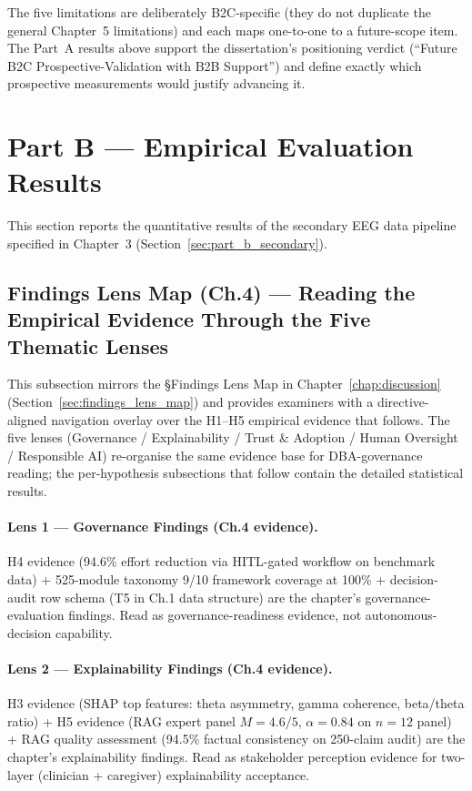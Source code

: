 \noindent The five limitations are deliberately B2C-specific (they do not duplicate the general Chapter~5 limitations) and each maps one-to-one to a future-scope item. The Part~A results above support the dissertation's positioning verdict (``Future B2C Prospective-Validation with B2B Support'') and define exactly which prospective measurements would justify advancing it.


\section{Part B --- Empirical Evaluation Results}
\label{sec:ch4_part_b}

This section reports the quantitative results of the secondary EEG data pipeline specified in Chapter~3 (Section~\ref{sec:part_b_secondary}).

\subsection{Findings Lens Map (Ch.4) --- Reading the Empirical Evidence Through the Five Thematic Lenses}
\label{sec:ch4_findings_lens_map}

This subsection mirrors the §Findings Lens Map in Chapter~\ref{chap:discussion} (Section~\ref{sec:findings_lens_map}) and provides examiners with a directive-aligned navigation overlay over the H1--H5 empirical evidence that follows. The five lenses (Governance / Explainability / Trust \& Adoption / Human Oversight / Responsible AI) re-organise the same evidence base for DBA-governance reading; the per-hypothesis subsections that follow contain the detailed statistical results.

\paragraph{Lens 1 --- Governance Findings (Ch.4 evidence).}
H4 evidence (94.6\% effort reduction via HITL-gated workflow on benchmark data) + 525-module taxonomy 9/10 framework coverage at 100\% + decision-audit row schema (T5 in Ch.1 data structure) are the chapter's governance-evaluation findings. Read as governance-readiness evidence, not autonomous-decision capability.

\paragraph{Lens 2 --- Explainability Findings (Ch.4 evidence).}
H3 evidence (SHAP top features: theta asymmetry, gamma coherence, beta/theta ratio) + H5 evidence (RAG expert panel $M = 4.6/5$, $\alpha = 0.84$ on $n = 12$ panel) + RAG quality assessment (94.5\% factual consistency on 250-claim audit) are the chapter's explainability findings. Read as stakeholder perception evidence for two-layer (clinician + caregiver) explainability acceptance.


